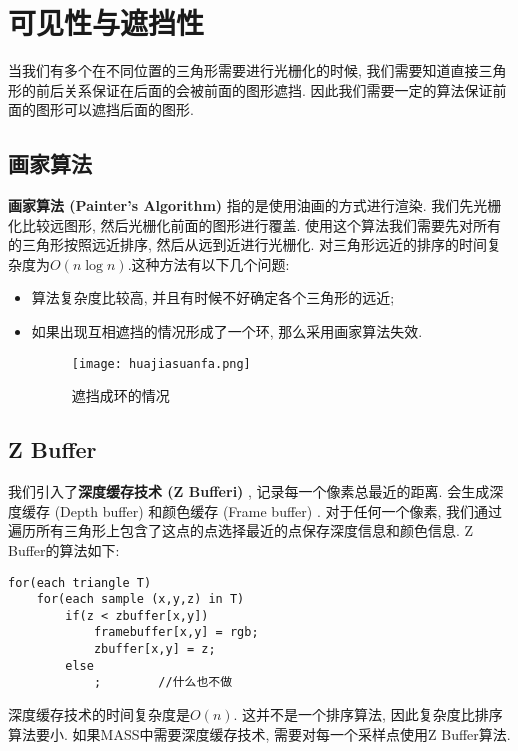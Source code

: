 \section{可见性与遮挡性}
当我们有多个在不同位置的三角形需要进行光栅化的时候, 我们需要知道直接三角形的前后关系保证在后面的会被前面的图形遮挡. 因此我们需要一定的算法保证前面的图形可以遮挡后面的图形. 

\subsection{画家算法}
\textbf{画家算法 (Painter's Algorithm) }指的是使用油画的方式进行渲染. 我们先光栅化比较远图形, 然后光栅化前面的图形进行覆盖. 使用这个算法我们需要先对所有的三角形按照远近排序, 然后从远到近进行光栅化. 对三角形远近的排序的时间复杂度为$O(n\log n)$.这种方法有以下几个问题: 
\begin{itemize}
	\item 算法复杂度比较高, 并且有时候不好确定各个三角形的远近; 
	\item 如果出现互相遮挡的情况形成了一个环, 那么采用画家算法失效. 
	\begin{figure}[H]
		\centering
		\texttt{[image: huajiasuanfa.png]}
		\caption{遮挡成环的情况}
		\label{fig:zhedang}
	\end{figure}
	
\end{itemize}

\subsection{Z Buffer}
我们引入了\textbf{深度缓存技术 (Z Bufferi) }, 记录每一个像素总最近的距离. 会生成深度缓存 (Depth buffer) 和颜色缓存 (Frame buffer) . 对于任何一个像素, 我们通过遍历所有三角形上包含了这点的点选择最近的点保存深度信息和颜色信息. 
Z Buffer的算法如下: 
\begin{lstlisting}
for(each triangle T)
	for(each sample (x,y,z) in T)
		if(z < zbuffer[x,y])
			framebuffer[x,y] = rgb;
			zbuffer[x,y] = z;
		else
			;        //什么也不做
\end{lstlisting}
深度缓存技术的时间复杂度是$O(n)$. 这并不是一个排序算法, 因此复杂度比排序算法要小. 如果MASS中需要深度缓存技术, 需要对每一个采样点使用Z Buffer算法. 
